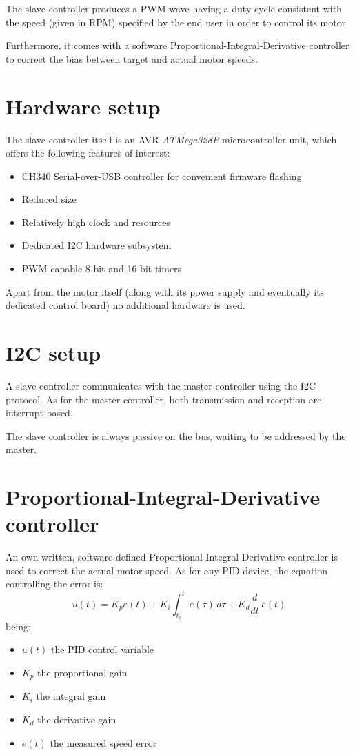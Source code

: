 \documentclass[binding=0.6cm,Lau]{sapthesis}
\begin{document}
The slave controller produces a PWM wave having a duty cycle consistent with
the speed (given in RPM) specified by the end user in order to control its
motor.

Furthermore, it comes with a software Proportional-Integral-Derivative
controller to correct the bias between target and actual motor speeds.

\section{Hardware setup}
The slave controller itself is an AVR \emph{ATMega328P} microcontroller
unit\cite{at328p-ref}, which offers the following features of interest:

\begin{itemize}
  \item CH340 Serial-over-USB controller for convenient firmware flashing
  \item Reduced size
  \item Relatively high clock and resources
  \item Dedicated I2C hardware subsystem
  \item PWM-capable 8-bit and 16-bit timers
\end{itemize}

Apart from the motor itself (along with its power supply and eventually its
dedicated control board) no additional hardware is used.

\section{I2C setup}
A slave controller communicates with the master controller using the I2C
protocol. As for the master controller, both transmission and reception are
interrupt-based.

The slave controller is always passive on the bus, waiting to be addressed by
the master.


\section{Proportional-Integral-Derivative controller}
An own-written, software-defined Proportional-Integral-Derivative controller is
used to correct the actual motor speed. As for any PID device, the equation
controlling the error is:
\begin{equation}
  u(t) = K_p e(t) + K_i \int_{t_0}^t e(\tau)\,d\tau + K_d \frac{d}{dt}\,e(t)
\end{equation}
being:
\begin{itemize}
  \item $u(t)$ the PID control variable
  \item $K_p$ the proportional gain
  \item $K_i$ the integral gain
  \item $K_d$ the derivative gain
  \item $e(t)$ the measured speed error
\end{itemize}
\end{document}
